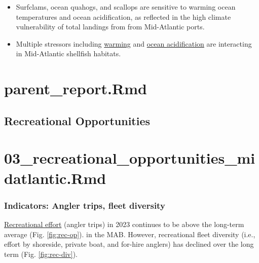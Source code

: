 \documentclass[
  10pt,
]{article}
\providecommand{\tightlist}{%
  \setlength{\itemsep}{0pt}\setlength{\parskip}{0pt}}
\begin{document}
\begin{itemize}
\tightlist
\item
  Surfclams, ocean quahogs, and scallops are sensitive to warming ocean temperatures and ocean acidification, as reflected in the high climate vulnerability of total landings from from Mid-Atlantic ports.
\item
  Multiple stressors including \href{https://noaa-edab.github.io/catalog/bottom_temp_insitu.html}{warming} and \href{https://noaa-edab.github.io/catalog/ocean_acidification}{ocean acidification} are interacting in Mid-Atlantic shellfish habitats.
\end{itemize}

\section{parent\_report.Rmd}\label{parent_report.rmd-2}

\subsection{Recreational Opportunities}\label{recreational-opportunities}

\section{03\_recreational\_opportunities\_midatlantic.Rmd}\label{recreational_opportunities_midatlantic.rmd}

\subsubsection{Indicators: Angler trips, fleet diversity}\label{indicators-angler-trips-fleet-diversity}

\href{https://noaa-edab.github.io/catalog/recdat.html}{Recreational effort} (angler trips) in 2023 continues to be above the long-term average (Fig. \ref{fig:rec-op}). in the MAB. However, recreational fleet diversity (i.e., effort by shoreside, private boat, and for-hire anglers) has declined over the long term (Fig. \ref{fig:rec-div}).
\end{document}
